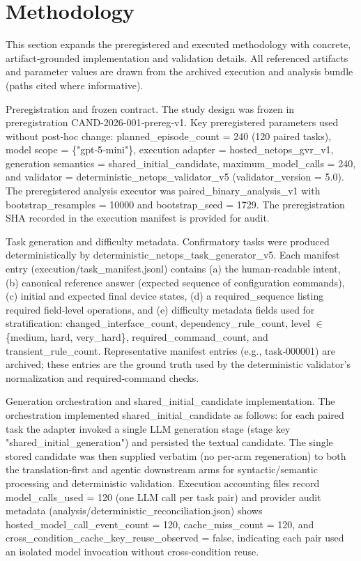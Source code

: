 \documentclass[conference]{IEEEtran}
\begin{document}
\section{Methodology}
This section expands the preregistered and executed methodology with concrete, artifact‑grounded implementation and validation details. All referenced artifacts and parameter values are drawn from the archived execution and analysis bundle (paths cited where informative).

Preregistration and frozen contract. The study design was frozen in preregistration CAND‑2026‑001‑prereg‑v1. Key preregistered parameters used without post‑hoc change: planned\_episode\_count = 240 (120 paired tasks), model scope = \{"gpt‑5‑mini"\}, execution adapter = hosted\_netops\_gvr\_v1, generation semantics = shared\_initial\_candidate, maximum\_model\_calls = 240, and validator = deterministic\_netops\_validator\_v5 (validator\_version = 5.0). The preregistered analysis executor was paired\_binary\_analysis\_v1 with bootstrap\_resamples = 10000 and bootstrap\_seed = 1729. The preregistration SHA recorded in the execution manifest is provided for audit.

Task generation and difficulty metadata. Confirmatory tasks were produced deterministically by deterministic\_netops\_task\_generator\_v5. Each manifest entry (execution/task\_manifest.jsonl) contains (a) the human‑readable intent, (b) canonical reference answer (expected sequence of configuration commands), (c) initial and expected final device states, (d) a required\_sequence listing required field‑level operations, and (e) difficulty metadata fields used for stratification: changed\_interface\_count, dependency\_rule\_count, level \ensuremath{\in} \{medium, hard, very\_hard\}, required\_command\_count, and transient\_rule\_count. Representative manifest entries (e.g., task‑000001) are archived; these entries are the ground truth used by the deterministic validator's normalization and required‑command checks.

Generation orchestration and shared\_initial\_candidate implementation. The orchestration implemented shared\_initial\_candidate as follows: for each paired task the adapter invoked a single LLM generation stage (stage key "shared\_initial\_generation") and persisted the textual candidate. The single stored candidate was then supplied verbatim (no per‑arm regeneration) to both the translation‑first and agentic downstream arms for syntactic/semantic processing and deterministic validation. Execution accounting files record model\_calls\_used = 120 (one LLM call per task pair) and provider audit metadata (analysis/deterministic\_reconciliation.json) shows hosted\_model\_call\_event\_count = 120, cache\_miss\_count = 120, and cross\_condition\_cache\_key\_reuse\_observed = false, indicating each pair used an isolated model invocation without cross‑condition reuse.
\end{document}
